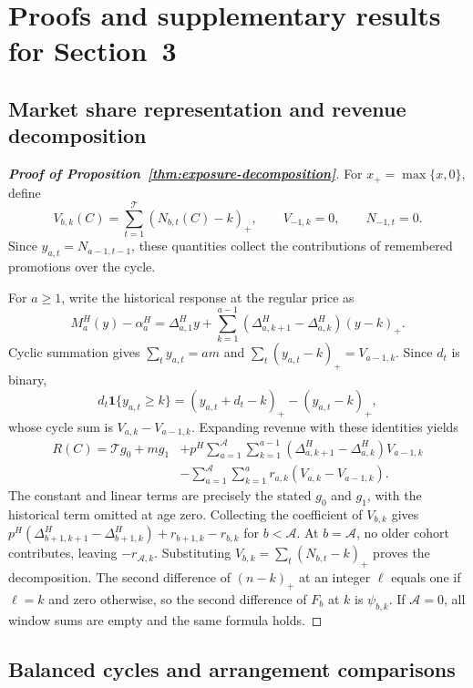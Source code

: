 \section{Proofs and supplementary results for Section~3}
\label{app:general-proofs}
\subsection{Market share representation and revenue decomposition}
\label{app:revenue-decomposition-proof}
\begin{proof}[\normalfont\bfseries Proof of Proposition~\ref{thm:exposure-decomposition}]
{\color{black}
For \(x_+=\max\{x,0\}\), define
\[
 V_{b,k}(C)=\sum_{t=1}^{\mathcal T}(N_{b,t}(C)-k)_+,
 \qquad V_{-1,k}=0,\qquad N_{-1,t}=0.
\]
Since \(y_{a,t}=N_{a-1,t-1}\), these quantities collect the contributions of remembered promotions over the cycle.
\par}
For \(a\ge1\), write the historical response at the regular price as
\[
 M_a^H(y)-\alpha_a^H
 =\Delta_{a,1}^H y+
 \sum_{k=1}^{a-1}(\Delta_{a,k+1}^H-\Delta_{a,k}^H)(y-k)_+.
\]
Cyclic summation gives \(\sum_t y_{a,t}=am\) and
\(\sum_t(y_{a,t}-k)_+=V_{a-1,k}\). Since \(d_t\) is binary,
\[
 d_t\mathbf1\{y_{a,t}\ge k\}
 =(y_{a,t}+d_t-k)_+-(y_{a,t}-k)_+,
\]
whose cycle sum is \(V_{a,k}-V_{a-1,k}\). Expanding revenue with these identities yields
\[
\begin{aligned}
 R(C)=\mathcal T g_0+mg_1
 &+p^H\sum_{a=1}^{\mathcal A}\sum_{k=1}^{a-1}
  (\Delta_{a,k+1}^H-\Delta_{a,k}^H)V_{a-1,k}\\
 &-\sum_{a=1}^{\mathcal A}\sum_{k=1}^a
  r_{a,k}(V_{a,k}-V_{a-1,k}).
\end{aligned}
\]
The constant and linear terms are precisely the stated \(g_0\) and \(g_1\), with the historical term omitted at age zero. Collecting the coefficient of \(V_{b,k}\) gives
\(p^H(\Delta_{b+1,k+1}^H-\Delta_{b+1,k}^H)+r_{b+1,k}-r_{b,k}\) for \(b<\mathcal A\). At \(b=\mathcal A\), no older cohort contributes, leaving \(-r_{\mathcal A,k}\).
Substituting \(V_{b,k}=\sum_t(N_{b,t}-k)_+\) proves the decomposition. The second difference of \((n-k)_+\) at an integer \(\ell\) equals one if \(\ell=k\) and zero otherwise, so the second difference of \(F_b\) at \(k\) is \(\psi_{b,k}\). If \(\mathcal A=0\), all window sums are empty and the same formula holds.
\end{proof}

\subsection{Balanced cycles and arrangement comparisons}

